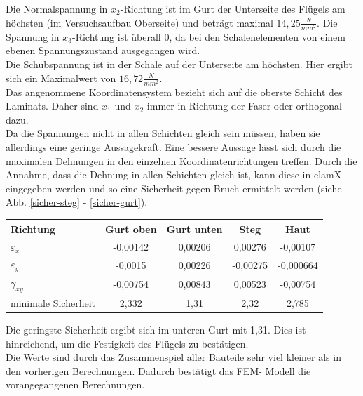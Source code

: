 Die Normalspannung in $x_{2}$-Richtung ist im Gurt der Unterseite des Flügels am höchsten (im Versuchsaufbau Oberseite) und beträgt maximal $14,25\frac{N}{mm^2}$. Die Spannung in $x_{3}$-Richtung ist überall 0, da bei den Schalenelementen von einem ebenen Spannungszustand ausgegangen wird.\\
Die Schubspannung ist in der Schale auf der Unterseite am höchsten. Hier ergibt sich ein Maximalwert von $16,72\frac{N}{mm^2}$.\\
\noindent
Das angenommene Koordinatensystem bezieht sich auf die oberste Schicht des Laminats. Daher sind $x_{1}$ und $x_{2}$ immer in Richtung der Faser oder orthogonal dazu.\\
Da die Spannungen nicht in allen Schichten gleich sein müssen, haben sie allerdings eine geringe Aussagekraft. Eine bessere Aussage lässt sich durch die maximalen Dehnungen in den einzelnen Koordinatenrichtungen treffen. Durch die Annahme, dass die Dehnung in allen Schichten gleich ist, kann diese in elamX eingegeben werden und so eine Sicherheit gegen Bruch ermittelt werden
(siehe Abb. \ref{sicher-steg} - \ref{sicher-gurt}).
\begin{center}
\begin{tabular}[h]{l|c|c|c|c}
Richtung&Gurt oben&Gurt unten&Steg&Haut\\
\hline
$\varepsilon_{x}$&-0,00142&0,00206&0,00276&-0,00107\\
$\varepsilon_{y}$&-0,0015&0,00226&-0,00275&-0,000664\\
$\gamma_{xy}$&-0,00754&0,00843&0,00523&-0,00754\\
minimale Sicherheit&2,332&1,31&2,32&2,785
\end{tabular}
\end{center}

\noindent
Die geringste Sicherheit ergibt sich im unteren Gurt mit 1,31. Dies ist hinreichend, um die Festigkeit des Flügels zu bestätigen.\\
\noindent
Die Werte sind durch das Zusammenspiel aller Bauteile sehr viel kleiner als in den vorherigen Berechnungen. Dadurch bestätigt das FEM- Modell die vorangegangenen Berechnungen.
\newpage
